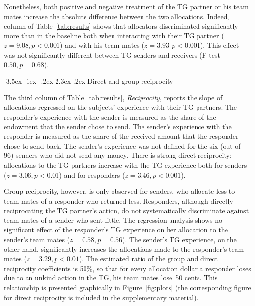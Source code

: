 \documentclass[12pt,a4paper]{article}\usepackage[]{graphicx}\usepackage[]{color}
\makeatletter
\renewcommand\subsection{\@startsection {subsection}{1}{\z@}%
{-3.5ex \@plus -1ex \@minus -.2ex}%
{2.3ex \@plus.2ex}%
{\it\large}}
\makeatother
\begin{document}
Nonetheless, both positive and negative treatment of the TG partner or his team mates increase the absolute difference between the two allocations. Indeed,
column of Table~\ref{tab:results} shows that allocators discriminated significantly more
than in the baseline both when interacting with their TG partner
($z=9.08,p< 0.001$) and with his team mates 
($z=3.93,p< 0.001$). This effect was not
significantly different between TG senders and receivers (F test $0.50,
p= 0.68$).

\subsection{Direct and group reciprocity}
\label{sec:reciprocity}

The third column of Table~\ref{tab:results}, \emph{Reciprocity}, reports the slope of
allocations regressed on the subjects' experience with their TG partners. 
The responder's experience with the sender is measured
as the share of the endowment that the sender chose to send. The sender's experience with the responder is measured as the share
of the received amount that the responder chose to send back. 
The sender's experience was not defined
for the six (out of 96) senders who did not send any money.
%
There is strong direct reciprocity: allocations
to the TG partners increase with the TG experience both for
senders ($z=3.06,p< 0.01$) and for responders 
($z=3.46,p< 0.001$).

Group reciprocity, however, is only observed for senders, who allocate
less to team mates of a responder who returned less.
Responders,  although directly reciprocating the
TG partner's action, do not systematically discriminate against team mates
of a sender who sent little. The regression analysis shows no significant
effect of the responder's TG experience on her allocation to the sender's
team mates ($z=0.58,p= 0.56$). 
The sender's TG experience, on the other
hand, significantly increases the allocations made to the responder's team mates 
($z=3.29,p< 0.01$).
The estimated ratio of the group and direct reciprocity coefficients
is 50\%, so that for every allocation dollar a responder
loses due to an unkind action in the TG, his team mates lose~50 cents. 
This relationship is presented graphically in Figure~\ref{fig:plots} (the corresponding figure for direct reciprocity is included in the supplementary material).
\end{document}
